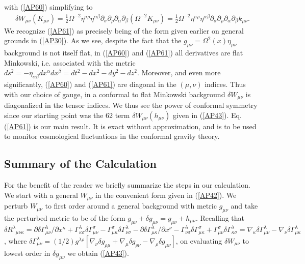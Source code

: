 \documentclass[aps]{revtex4}
\begin{document}
%
with (\ref{AP60})  simplifying to 
%
\begin{eqnarray}
\delta W_{\mu\nu}(K_{\mu\nu})=\frac{1}{2}\Omega^{-2}\eta^{\sigma\rho}\eta^{\alpha\beta}\partial_{\sigma}\partial_{\rho} \partial_{\alpha}\partial_{\beta}(\Omega^{-2}K_{\mu\nu})
=\frac{1}{2}\Omega^{-2}\eta^{\sigma\rho}\eta^{\alpha\beta}\partial_{\sigma}\partial_{\rho} \partial_{\alpha}\partial_{\beta}k_{\mu\nu}.
\label{AP61}
\end{eqnarray}
%
We recognize (\ref{AP61}) as precisely being of the form given earlier on general grounds in  (\ref{AP30}). As we see, despite the fact that the $g_{\mu\nu}=\Omega^2(x)\eta_{\mu\nu}$ background is not itself flat, in (\ref{AP60}) and (\ref{AP61}) all derivatives are flat Minkowski, i.e. associated with the metric $ds^2=-\eta_{\alpha\beta}dx^{\alpha}dx^{\beta}=dt^2-dx^2-dy^2-dz^2$. Moreover, and even more significantly, (\ref{AP60}) and (\ref{AP61}) are diagonal in the $(\mu,\nu)$ indices. Thus with our choice of gauge, in a conformal to flat Minkowski background $\delta W_{\mu\nu}$ is diagonalized in the tensor indices. We thus see the power of conformal symmetry since our starting point was the 62 term $\delta W_{\mu\nu}(h_{\mu\nu})$ given in (\ref{AP43}). Eq. (\ref{AP61}) is our main result. It is exact without approximation, and is to be used to monitor cosmological fluctuations in the conformal gravity theory.

\subsection{Summary of the Calculation}


For the benefit of the reader we briefly summarize the steps in our calculation. We start with a general $W_{\mu\nu}$ in the convenient form given in (\ref{AP42}). We perturb $W_{\mu\nu}$ to first order around a general background  with metric $g_{\mu\nu}$ and take the perturbed metric to be of the form  $g_{\mu\nu}+\delta g_{\mu\nu}=g_{\mu\nu}+h_{\mu\nu}$. Recalling  that $\delta R^{\lambda}_{\phantom{\lambda}\mu\nu\kappa}=
\partial \delta\Gamma^{\lambda}_{\mu\nu}/\partial x^{\kappa}
+\Gamma^{\lambda}_{\kappa\sigma}\delta\Gamma^{\sigma}_{\mu\nu}
-\Gamma^{\sigma}_{\mu\kappa}\delta\Gamma^{\lambda}_{\nu\sigma}
-\partial \delta\Gamma^{\lambda}_{\mu\kappa}/\partial x^{\nu}
-\Gamma^{\lambda}_{\nu\sigma}\delta\Gamma^{\sigma}_{\mu\kappa}
+\Gamma^{\sigma}_{\mu\nu}\delta\Gamma^{\lambda}_{\kappa\sigma}=
\nabla_{\kappa}\delta\Gamma^{\lambda}_{\mu\nu}
-\nabla_{\nu}\delta\Gamma^{\lambda}_{\mu\kappa}$, where $\delta\Gamma^{\lambda}_{\mu\nu}=(1/2)g^{\lambda \rho}[\nabla_{\nu}\delta g_{\rho\mu}+\nabla_{\mu}\delta g_{\rho\nu}-\nabla_{\rho}\delta g_{\mu\nu}]$, on evaluating $\delta W_{\mu\nu}$ to lowest order in $\delta g_{\mu\nu}$ we obtain (\ref{AP43}). 
\end{document}
